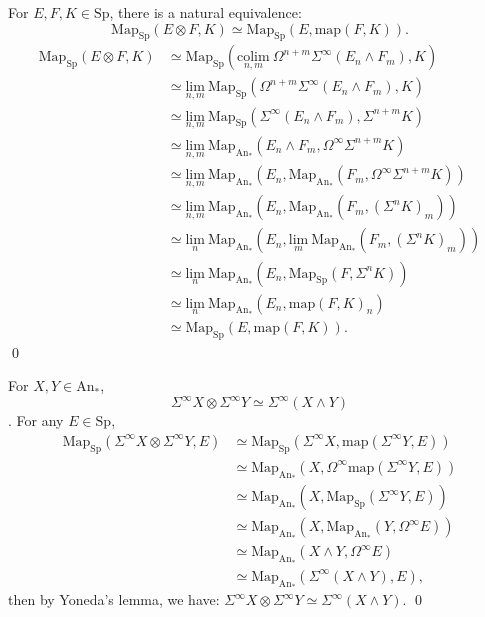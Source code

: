 \documentclass[UTF8,12,a4paper]{ctexart}
\theoremstyle{definition}
\newcommand{\An}{\text{An}}
\newcommand{\Sp}{\text{Sp}}
\begin{document}
\prop 
For $E,F,K\in \Sp$, there is a natural equivalence:
$$
\text{Map}_\Sp(E\otimes F, K)\simeq \text{Map}_\Sp(E,\text{map}(F,K)).
$$
\pf 
\begin{align*}
\text{Map}_\Sp(E\otimes F, K)
&\simeq \text{Map}_\Sp(\underset{n,m}{\text{colim}}\ \Omega^{n+m}\Sigma^\infty(E_n\wedge F_m), K)\\
&\simeq \underset{n,m}{\text{lim}}\  \text{Map}_\Sp
(\Omega^{n+m}\Sigma^\infty(E_n\wedge F_m), K)\\
&\simeq \underset{n,m}{\text{lim}}\  \text{Map}_\Sp
(\Sigma^\infty(E_n\wedge F_m),\Sigma^{n+m} K)\\
&\simeq \underset{n,m}{\text{lim}}\  \text{Map}_{\An_*}
(E_n\wedge F_m,\Omega^\infty \Sigma^{n+m} K)\\
&\simeq \underset{n,m}{\text{lim}}\  \text{Map}_{\An_*}
(E_n,\text{Map}_{\An_*}(F_m,\Omega^\infty \Sigma^{n+m} K))\\
&\simeq \underset{n,m}{\text{lim}}\  \text{Map}_{\An_*}
(E_n,\text{Map}_{\An_*}(F_m,(\Sigma^n K)_m))\\
&\simeq \underset{n}{\text{lim}}\  \text{Map}_{\An_*}
(E_n,\underset{m}{\text{lim}}\ \text{Map}_{\An_*}(F_m,(\Sigma^n K)_m))\\
&\simeq \underset{n}{\text{lim}}\  \text{Map}_{\An_*}
(E_n,\text{Map}_{\Sp}(F,\Sigma^n K))\\
&\simeq \underset{n}{\text{lim}}\  \text{Map}_{\An_*}
(E_n,\text{map}(F,K)_n)\\
&\simeq  \text{Map}_{\Sp}
(E,\text{map}(F,K)).
\end{align*}
\qed


\prop 
For $X, Y\in \An_*$,
$$\Sigma^\infty X\otimes \Sigma^\infty Y\simeq
\Sigma^\infty(X\wedge Y)$$.
\pf For any $E\in\Sp$,
\begin{align*}
\text{Map}_{\Sp}(\Sigma^\infty X\otimes \Sigma^\infty Y,E)
&\simeq \text{Map}_{\Sp}(\Sigma^\infty X,\text{map}(\Sigma^\infty Y,E))\\
&\simeq \text{Map}_{\An_*}(X,\Omega^\infty \text{map}(\Sigma^\infty Y,E))\\
&\simeq \text{Map}_{\An_*}(X,\text{Map}_{\Sp}(\Sigma^\infty Y,E))\\
&\simeq \text{Map}_{\An_*}(X,\text{Map}_{\An_*}( Y,\Omega^\infty E))\\
&\simeq \text{Map}_{\An_*}(X\wedge Y,\Omega^\infty E)\\
&\simeq \text{Map}_{\An_*}(\Sigma^\infty (X\wedge Y),E),
\end{align*}
then by Yoneda's lemma, we have: 
$\Sigma^\infty X\otimes \Sigma^\infty Y\simeq
\Sigma^\infty(X\wedge Y).$
\qed 
\end{document}
